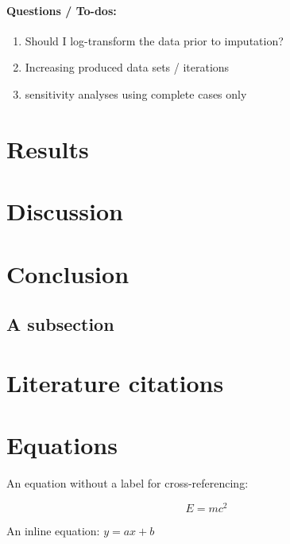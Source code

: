 \documentclass[webpdf,large,contemporary,namedate]{oup-authoring-template}
\providecommand{\tightlist}{%
  \setlength{\itemsep}{0pt}\setlength{\parskip}{0pt}}
\theoremstyle{thmstyleone}
\theoremstyle{thmstyletwo}
\theoremstyle{thmstylethree}
\begin{document}
\hypertarget{questions-to-dos}{%
\paragraph{Questions / To-dos:}\label{questions-to-dos}}

\begin{enumerate}
\def\labelenumi{\arabic{enumi}.}
\tightlist
\item
  Should I log-transform the data prior to imputation?
\item
  Increasing produced data sets / iterations
\item
  sensitivity analyses using complete cases only
\end{enumerate}

\hypertarget{results}{%
\section{Results}\label{results}}

\hypertarget{discussion}{%
\section{Discussion}\label{discussion}}

\hypertarget{conclusion}{%
\section{Conclusion}\label{conclusion}}

\hypertarget{a-subsection}{%
\subsection{A subsection}\label{a-subsection}}

\hypertarget{literature-citations}{%
\section{Literature citations}\label{literature-citations}}

\hypertarget{equations}{%
\section{Equations}\label{equations}}

An equation without a label for cross-referencing:

\[
E=mc^2
\]

An inline equation: \(y=ax+b\)
\end{document}
